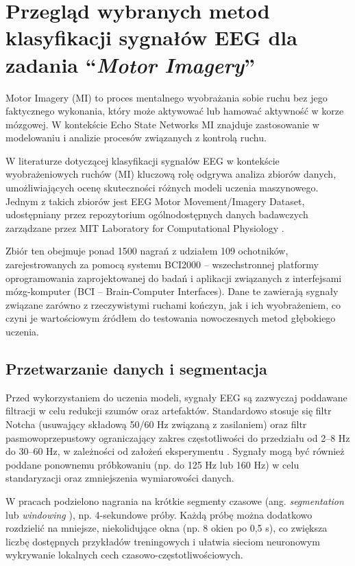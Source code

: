 \documentclass[eeg_v4.tex]{subfiles}
\begin{document}
    \section{Przegląd wybranych metod klasyfikacji sygnałów EEG dla zadania ``\emph{Motor Imagery}''}
    \label{sec:metody_eeg}
    Motor Imagery (MI) to proces mentalnego wyobrażania sobie ruchu bez jego faktycznego wykonania, który może aktywować
    lub hamować aktywność w korze mózgowej. W kontekście Echo State Networks MI znajduje zastosowanie w modelowaniu i
    analizie procesów związanych z kontrolą ruchu.

    W literaturze dotyczącej klasyfikacji sygnałów EEG w kontekście wyobrażeniowych ruchów (MI) kluczową rolę odgrywa
    analiza zbiorów danych, umożliwiających ocenę skuteczności różnych modeli uczenia maszynowego. Jednym z takich
    zbiorów jest EEG Motor Movement/Imagery Dataset, udostępniany przez repozytorium ogólnodostępnych danych badawczych
    zarządzane przez MIT Laboratory for Computational Physiology \cite{goldberger2000}.

    Zbiór ten obejmuje ponad 1500 nagrań z udziałem 109 ochotników, zarejestrowanych za pomocą systemu BCI2000 –
    wszechstronnej platformy oprogramowania zaprojektowanej do badań i aplikacji związanych z interfejsami mózg-komputer
    (BCI – Brain-Computer Interfaces). Dane te zawierają sygnały związane zarówno z rzeczywistymi ruchami kończyn, jak i
    ich wyobrażeniem, co czyni je wartościowym źródłem do testowania nowoczesnych metod głębokiego uczenia.

    \subsection{Przetwarzanie danych i segmentacja}
    Przed wykorzystaniem do uczenia modeli, sygnały EEG są zazwyczaj poddawane filtracji w celu redukcji szumów oraz
    artefaktów. Standardowo stosuje się filtr Notcha (usuwający składową 50/60 Hz związaną z zasilaniem) oraz filtr
    pasmowoprzepustowy ograniczający zakres częstotliwości do przedziału od 2--8 Hz do 30--60 Hz, w zależności od
    założeń eksperymentu \cite{boutarfaia2023,roots2020}
    . Sygnały mogą być również poddane ponownemu próbkowaniu (np. do 125 Hz lub 160 Hz) w celu standaryzacji oraz
    zmniejszenia
    wymiarowości danych.

    W pracach \cite{boutarfaia2023,roots2020} podzielono nagrania na krótkie segmenty czasowe (ang. \emph{segmentation}
    lub \emph{windowing}
    ), np. 4-sekundowe próby. Każdą próbę można dodatkowo rozdzielić na mniejsze, niekolidujące okna (np. 8 okien po 0,5
    s), co zwiększa liczbę dostępnych przykładów treningowych i ułatwia sieciom neuronowym wykrywanie lokalnych cech
    czasowo-częstotliwościowych.
\end{document}
